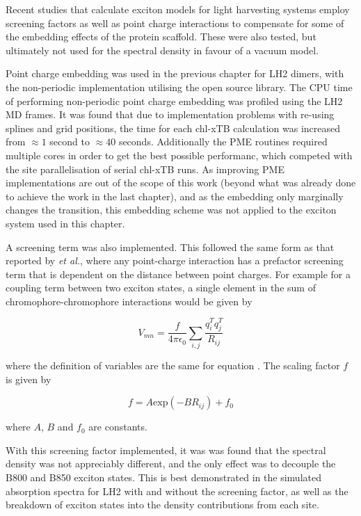 Recent studies that calculate exciton models for light harvesting systems employ
screening factors as well as point charge interactions to compensate for some of
the embedding effects of the protein scaffold. These were also tested, but ultimately
not used for the spectral density in favour of a vacuum model.

Point charge embedding was used in the previous chapter for LH2 dimers, with the
non-periodic implementation utilising the open source  library. The
CPU time of performing non-periodic point charge embedding was profiled using the
LH2 MD frames. It was found that due to implementation problems with re-using splines
and grid positions, the time for each chl-xTB calculation was increased from $\approx 1$
second to  $\approx 40$ seconds. Additionally the PME routines required multiple 
cores in order to get the best possible performanc, which competed with the site 
parallelisation of serial chl-xTB runs. As improving PME implementations are out
of the scope of this work (beyond what was already done to achieve the work in the
last chapter), and as the embedding only marginally changes the \Qy transition,
this embedding scheme was not applied to the exciton system used in this chapter.

A screening term was also implemented. This followed the same form as that reported
by \emph{et al.}, where any point-charge interaction has a prefactor screening term
that is dependent on the distance between point charges. For example for a coupling
term between two exciton states, a single element in the sum of chromophore-chromophore
interactions would be given by

\begin{equation}
    V_{mn} = \frac{f}{4\pi\epsilon_0} \sum_{i,j} \frac{q^T_i q^T_j}{R_{ij}}
\end{equation}

where the definition of variables are the same for equation . The scaling factor 
$f$ is given by

\begin{equation}
    f = A \text{exp}\left(-B R_{ij}\right) + f_0
\end{equation}

where $A$, $B$ and $f_0$ are constants. 

With this screening factor implemented, it was was found that the spectral density
was not appreciably different, and the only effect  was to decouple the B800 and
B850 exciton states. This is best demonstrated in the simulated absorption spectra 
for LH2 with and without the screening factor, as well as the breakdown of exciton
states into the density contributions from each site.

